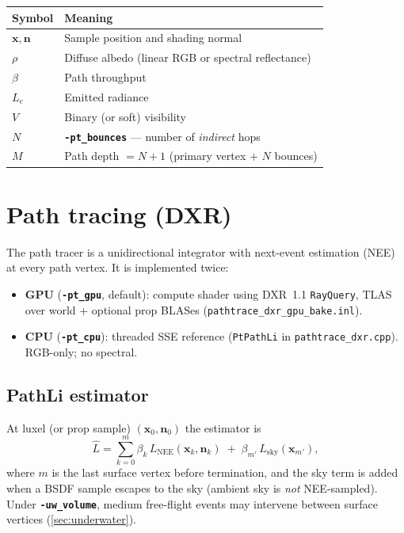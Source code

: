 \documentclass[11pt,a4paper]{article}
\newcommand{\flag}[1]{\texttt{\bfseries #1}}
\newcommand{\code}[1]{\texttt{#1}}
\newcommand{\vect}[1]{\bm{#1}}
\begin{document}
\begin{tabularx}{\textwidth}{@{}lX@{}}
  \toprule
  Symbol & Meaning \\
  \midrule
  $\vect{x},\vect{n}$ & Sample position and shading normal \\
  $\rho$ & Diffuse albedo (linear RGB or spectral reflectance) \\
  $\beta$ & Path throughput \\
  $L_e$ & Emitted radiance \\
  $V$ & Binary (or soft) visibility \\
  $N$ & \flag{-pt\_bounces} --- number of \emph{indirect} hops \\
  $M$ & Path depth $= N+1$ (primary vertex $+$ $N$ bounces) \\
  \bottomrule
\end{tabularx}

\section{Path tracing (DXR)}
\label{sec:pathtrace}

The path tracer is a unidirectional integrator with next-event
estimation (NEE) at every path vertex. It is implemented twice:

\begin{itemize}[leftmargin=1.4em]
  \item \textbf{GPU} (\flag{-pt\_gpu}, default): compute shader using DXR~1.1
        \code{RayQuery}, TLAS over world + optional prop BLASes
        (\code{pathtrace\_dxr\_gpu\_bake.inl}).
  \item \textbf{CPU} (\flag{-pt\_cpu}): threaded SSE reference
        (\code{PtPathLi} in \code{pathtrace\_dxr.cpp}). RGB-only; no spectral.
\end{itemize}

\subsection{PathLi estimator}

At luxel (or prop sample) $(\vect{x}_0,\vect{n}_0)$ the estimator is
\begin{equation}
  \hat{L}
  =
  \sum_{k=0}^{m}
  \beta_k\, L_{\mathrm{NEE}}(\vect{x}_k,\vect{n}_k)
  \;+\;
  \beta_{m'}\, L_{\mathrm{sky}}(\vect{x}_{m'}),
  \label{eq:pathli}
\end{equation}
where $m$ is the last surface vertex before termination, and the sky term is
added when a BSDF sample escapes to the sky (ambient sky is \emph{not} NEE-sampled).
Under \flag{-uw\_volume}, medium free-flight events may intervene between
surface vertices (\cref{sec:underwater}).
\end{document}
